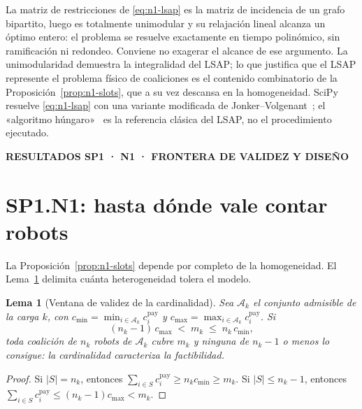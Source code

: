 \documentclass[12pt,a4paper]{article}
\newcommand{\leveltag}[1]{%
  \noindent\colorbox{VIUDark}{%
    \parbox{\dimexpr\textwidth-2\fboxsep\relax}{%
      \color{white}\sffamily\bfseries\small #1%
    }%
  }\par\smallskip
}
\newtheorem{n1lema}{Lema}
\begin{document}
La matriz de restricciones de \eqref{eq:n1-lsap} es la matriz de incidencia de
un grafo bipartito, luego es totalmente unimodular y su relajación lineal
alcanza un óptimo entero: el problema se resuelve exactamente en tiempo
polinómico, sin ramificación ni redondeo. Conviene no exagerar el alcance de
ese argumento. La unimodularidad demuestra la integralidad del LSAP; lo que
justifica que el LSAP represente el problema físico de coaliciones es el
contenido combinatorio de la Proposición~\ref{prop:n1-slots}, que a su vez
descansa en la homogeneidad. SciPy resuelve \eqref{eq:n1-lsap} con una variante
modificada de Jonker--Volgenant~\parencite{jonkerVolgenant1987Shortest,
crouse2016Rectangular}; el «algoritmo húngaro»~\parencite{kuhn1955Hungarian} es
la referencia clásica del LSAP, no el procedimiento ejecutado.


\clearpage

\leveltag{RESULTADOS SP1 · N1 · FRONTERA DE VALIDEZ Y DISEÑO}
\section*{SP1.N1: hasta dónde vale contar robots}

La Proposición~\ref{prop:n1-slots} depende por completo de la homogeneidad. El
Lema~\ref{lema:n1-boundary} delimita cuánta heterogeneidad tolera el modelo.

\begin{n1lema}[Ventana de validez de la cardinalidad]
\label{lema:n1-boundary}
Sea $\mathcal A_k$ el conjunto admisible de la carga $k$, con
$c_{\min}=\min_{i\in\mathcal A_k}c_i^{\mathrm{pay}}$ y
$c_{\max}=\max_{i\in\mathcal A_k}c_i^{\mathrm{pay}}$. Si
\begin{equation}
\label{eq:n1-window}
 (n_k-1)\,c_{\max}\;<\;m_k\;\leq\;n_k\,c_{\min},
\end{equation}
toda coalición de $n_k$ robots de $\mathcal A_k$ cubre $m_k$ y ninguna de
$n_k-1$ o menos lo consigue: la cardinalidad caracteriza la factibilidad.
\end{n1lema}

{\small
\begin{proof}
Si $|S|=n_k$, entonces $\sum_{i\in S}c_i^{\mathrm{pay}}\geq n_kc_{\min}\geq m_k$.
Si $|S|\leq n_k-1$, entonces
$\sum_{i\in S}c_i^{\mathrm{pay}}\leq(n_k-1)c_{\max}<m_k$.
\end{proof}
}
\end{document}
